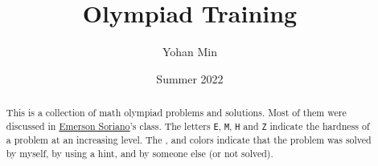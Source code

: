 \documentclass[11pt]{scrartcl}
\title{Olympiad Training}
\author{Yohan Min}
\date{Summer 2022}
\begin{document}
\maketitle

\begin{abstract}
	This is a collection of math olympiad problems and solutions. Most of them were discussed in \href{https://www.facebook.com/emerson.sorianoperez}{Emerson Soriano}'s class. The letters \verb|E|, \verb|M|, \verb|H| and \verb|Z| indicate the hardness of a problem at an increasing level. The ,  and  colors indicate that the problem was solved by myself, by using a hint, and by someone else (or not solved).
\end{abstract}

\tableofcontents






\end{document}

